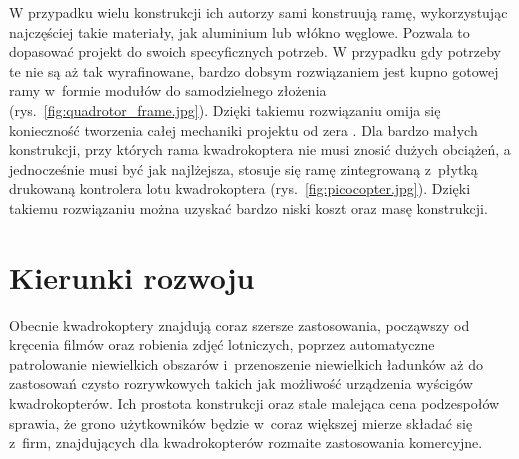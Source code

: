 W przypadku wielu konstrukcji ich autorzy sami konstruują ramę, wykorzystując najczęściej takie materiały, jak aluminium lub włókno węglowe. Pozwala to dopasować projekt do swoich specyficznych potrzeb. W przypadku gdy potrzeby te nie są aż tak wyrafinowane, bardzo dobsym rozwiązaniem jest kupno gotowej ramy w~formie modułów do samodzielnego złożenia (rys.~\ref{fig:quadrotor_frame.jpg}). Dzięki takiemu rozwiązaniu omija się konieczność tworzenia całej mechaniki projektu od zera . Dla bardzo małych konstrukcji, przy których rama kwadrokoptera nie musi znosić dużych obciążeń, a jednocześnie musi być jak najlżejsza, stosuje się ramę zintegrowaną z~płytką drukowaną kontrolera lotu kwadrokoptera (rys.~\ref{fig:picocopter.jpg}). Dzięki takiemu rozwiązaniu można uzyskać bardzo niski koszt oraz masę konstrukcji. 


\section{Kierunki rozwoju}

Obecnie kwadrokoptery znajdują coraz szersze zastosowania, począwszy od kręcenia filmów oraz robienia zdjęć lotniczych, poprzez automatyczne patrolowanie niewielkich obszarów i~przenoszenie niewielkich ładunków aż do zastosowań czysto rozrywkowych takich jak możliwość urządzenia wyścigów kwadrokopterów. Ich prostota konstrukcji oraz stale malejąca cena podzespołów sprawia, że grono użytkowników będzie w~coraz większej mierze składać się z~firm, znajdujących dla kwadrokopterów rozmaite zastosowania komercyjne. 

